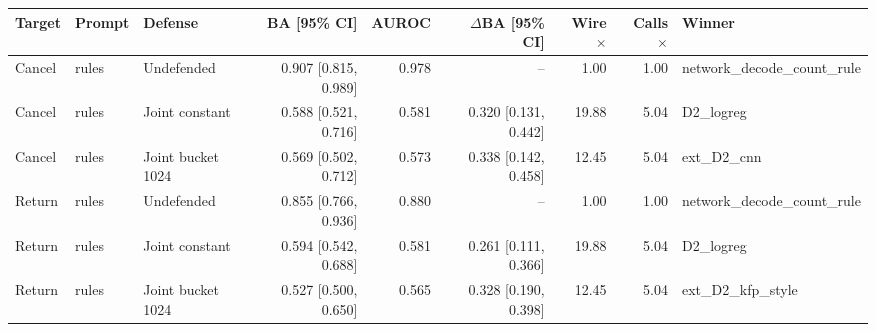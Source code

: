 \begin{tabular}{lllrrrrrl}
\toprule
Target & Prompt & Defense & BA [95\% CI] & AUROC & $\Delta$BA [95\% CI] & Wire $\times$ & Calls $\times$ & Winner \\
\midrule
Cancel & rules & Undefended & 0.907 [0.815, 0.989] & 0.978 & -- & 1.00 & 1.00 & network\_decode\_count\_rule \\
Cancel & rules & Joint constant & 0.588 [0.521, 0.716] & 0.581 & 0.320 [0.131, 0.442] & 19.88 & 5.04 & D2\_logreg \\
Cancel & rules & Joint bucket 1024 & 0.569 [0.502, 0.712] & 0.573 & 0.338 [0.142, 0.458] & 12.45 & 5.04 & ext\_D2\_cnn \\
Return & rules & Undefended & 0.855 [0.766, 0.936] & 0.880 & -- & 1.00 & 1.00 & network\_decode\_count\_rule \\
Return & rules & Joint constant & 0.594 [0.542, 0.688] & 0.581 & 0.261 [0.111, 0.366] & 19.88 & 5.04 & D2\_logreg \\
Return & rules & Joint bucket 1024 & 0.527 [0.500, 0.650] & 0.565 & 0.328 [0.190, 0.398] & 12.45 & 5.04 & ext\_D2\_kfp\_style \\
\bottomrule
\end{tabular}
